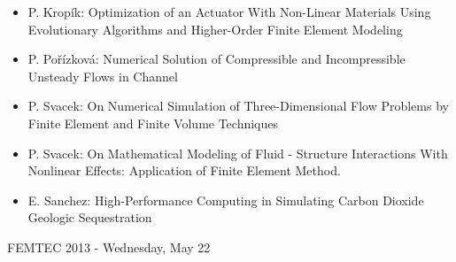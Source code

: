 \documentclass[10pt]{article}%
\begin{document}
\begin{itemize}
\begin{itemize}
    \item {P. Kropík}: {Optimization of an Actuator With Non-Linear Materials Using Evolutionary Algorithms and Higher-Order Finite Element Modeling}
    \item {P. Pořízková}: {Numerical Solution of Compressible and Incompressible Unsteady Flows in Channel}
	\item {P. Svacek}: {On Numerical Simulation of Three-Dimensional Flow Problems by Finite Element and Finite Volume Techniques}
	\item {P. Svacek}: {On Mathematical Modeling of Fluid - Structure Interactions With Nonlinear Effects: Application of Finite Element Method.}
    \item {E. Sanchez}: {High-Performance Computing in Simulating Carbon Dioxide Geologic Sequestration}
  \end{itemize}
   
\end{itemize}

\newpage

\centerline{\huge FEMTEC 2013 - Wednesday, May 22}
\vspace{4mm}
\end{document}

